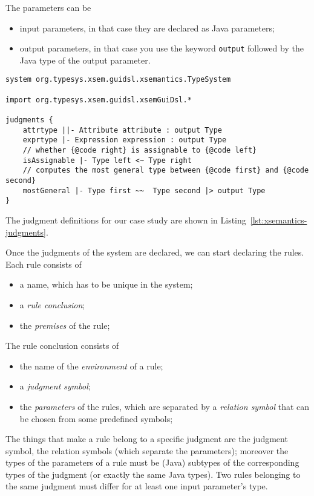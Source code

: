 \noindent
The parameters can be

\begin{itemize}
\item 
input parameters, in that case they are declared as Java parameters;
\item 
output parameters, in that case you use the keyword
\verb|output| followed by the Java
type of the output parameter.
\end{itemize}

\begin{lstlisting}[language=xsemantics,float,label=lst:xsemantics-judgments,caption=Judgment
definitions in Xsemantics]
system org.typesys.xsem.guidsl.xsemantics.TypeSystem

import org.typesys.xsem.guidsl.xsemGuiDsl.*

judgments {
	attrtype ||- Attribute attribute : output Type
	exprtype |- Expression expression : output Type
	// whether {@code right} is assignable to {@code left}
	isAssignable |- Type left <~ Type right
	// computes the most general type between {@code first} and {@code second}
	mostGeneral |- Type first ~~  Type second |> output Type
}
\end{lstlisting}

\noindent
The judgment definitions for our case study are shown in
Listing~\ref{lst:xsemantics-judgments}.

Once the judgments of the system are declared, we can start declaring the
rules.  Each rule consists of

\begin{itemize}
\item
a name, which has to be unique in the system;
\item
a \textit{rule conclusion};
\item
the \textit{premises} of the rule;
\end{itemize}

\noindent
The rule conclusion consists of

\begin{itemize}
\item
the name of the \textit{environment} of a rule;
\item
a \textit{judgment symbol};
\item
the \textit{parameters} of the rules, which are separated by
a \textit{relation symbol} that can be chosen from some predefined symbols;
\end{itemize}

The things that make a rule belong to a specific judgment are the judgment
symbol, the relation symbols (which separate the parameters); moreover the types
of the parameters of a rule must be (Java) subtypes of the corresponding types
of the judgment (or exactly the same Java types).  Two rules belonging to the
same judgment must differ for at least one input parameter's type.

